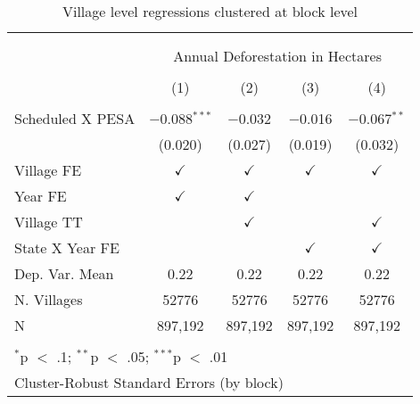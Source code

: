 
\begin{table}[!htbp] \centering 
  \caption{Village level regressions clustered at block level} 
  \label{table:regres2} 
\begin{tabular}{@{\extracolsep{0pt}}lcccc} 
\\[-1.8ex]\hline \\[-1.8ex] 
\\[-1.8ex] & \multicolumn{4}{c}{Annual Deforestation in Hectares} \\ 
\\[-1.8ex] & (1) & (2) & (3) & (4)\\ 
\hline \\[-1.8ex] 
 Scheduled X PESA & $-$0.088$^{***}$ & $-$0.032 & $-$0.016 & $-$0.067$^{**}$ \\ 
  & (0.020) & (0.027) & (0.019) & (0.032) \\ 
 Village FE & $\checkmark$ & $\checkmark$ & $\checkmark$ & $\checkmark$ \\ 
Year FE & $\checkmark$ & $\checkmark$ &  &  \\ 
Village TT &  & $\checkmark$ &  & $\checkmark$ \\ 
State X Year FE &  &  & $\checkmark$ & $\checkmark$ \\ 
Dep. Var. Mean & 0.22 & 0.22 & 0.22 & 0.22 \\ 
N. Villages & 52776 & 52776 & 52776 & 52776 \\ 
N & 897,192 & 897,192 & 897,192 & 897,192 \\ 
\hline \\[-1.8ex] 
\multicolumn{5}{l}{$^{*}$p $<$ .1; $^{**}$p $<$ .05; $^{***}$p $<$ .01} \\ 
\multicolumn{5}{l}{Cluster-Robust Standard Errors (by block)} \\ 
\end{tabular} 
\end{table} 
